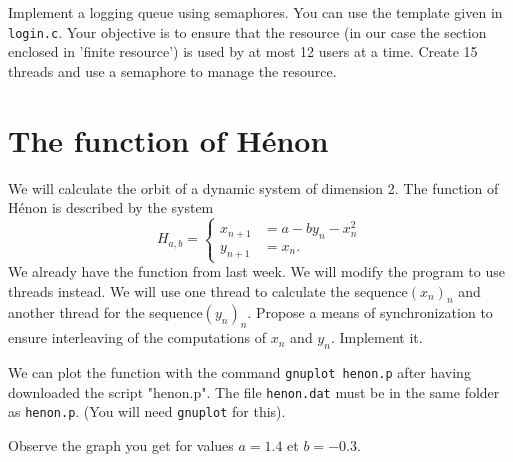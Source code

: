 \documentclass[11pt]{article}
\begin{document}
Implement a logging queue using semaphores. You can use the template given in \texttt{login.c}. Your objective is to ensure that the resource (in our case the section enclosed in 'finite resource') is used by at most 12 users at a time. Create 15 threads and use a semaphore to manage the resource.

\section{The function of Hénon}

We will calculate the orbit of a dynamic system of dimension 2. The function of Hénon is described by the system 
\begin{equation*}
	\label{eq:1}
	H_{a,b} = \left\{
	\begin{aligned}
		x_{n+1} &= a - by_{n} - x_{n}^{2} \\
		y_{n+1} &= x_{n}.
	\end{aligned}
	\right.
\end{equation*}
We already have the function from last week. We will modify the program to use threads instead. We will use one thread to calculate the sequence\( (x_{n})_{n} \) and another thread for the sequence\( (y_{n})_{n} \). Propose a means of synchronization to ensure interleaving of the computations of $x_n$ and $y_n$. Implement it. 

We can plot the function with the command \texttt{gnuplot henon.p} after having downloaded the script "henon.p". The file \texttt{henon.dat} must be in the same folder as \texttt{henon.p}. (You will need \texttt{gnuplot} for this).

Observe the graph you get for values \( a = 1.4 \) et \( b = -0.3 \).
\end{document}
